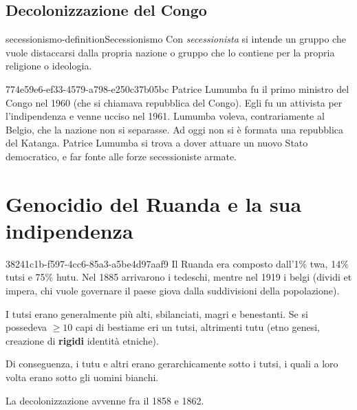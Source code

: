 \documentclass[preview]{standalone}
\begin{document}
\subsection{Decolonizzazione del Congo}


\begin{snippetdefinition}{secessionismo-definition}{Secessionismo}
    Con \textit{secessionista} si intende un gruppo che vuole distaccarsi
    dalla propria nazione o gruppo che lo contiene per la propria religione o ideologia.
\end{snippetdefinition}

\begin{snippet}{774e59e6-ef33-4579-a798-e250c37b05bc}
    Patrice Lumumba fu il primo ministro del Congo nel 1960 (che si chiamava repubblica del Congo).
    Egli fu un attivista per l'indipendenza e venne ucciso nel 1961.
    Lumumba voleva, contrariamente al Belgio, che la nazione non si separasse.
    Ad oggi non si è formata una repubblica del Katanga.
    Patrice Lumumba si trova a dover attuare un nuovo Stato democratico,
    e far fonte alle forze secessioniste armate.
    
    
\end{snippet}

\section{Genocidio del Ruanda e la sua indipendenza}

\begin{snippet}{38241c1b-f597-4cc6-85a3-a5be4d97aaf9}
    Il Ruanda era composto dall'1\% twa, 14\% tutsi e 75\% hutu.
    Nel 1885 arrivarono i tedeschi, mentre nel 1919 i belgi (dividi et impera, chi vuole governare
    il paese giova dalla suddivisioni della popolazione).
    
    I tutsi erano generalmente più alti, sbilanciati, magri e benestanti.
    Se si possedeva \(\geq 10\) capi di bestiame eri un tutsi, altrimenti tutu (etno genesi,
    creazione di \textbf{rigidi} identità etniche).
    
    Di conseguenza, i tutu e altri erano gerarchicamente sotto i tutsi, i quali a loro volta
    erano sotto gli uomini bianchi.
    
    La decolonizzazione avvenne fra il 1858 e 1862.
    
\end{snippet}
\end{document}
